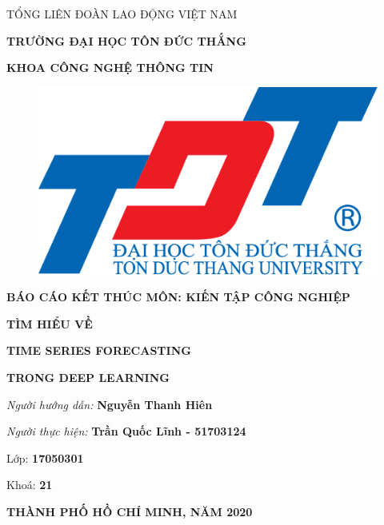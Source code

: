 
\changefontsizes[14pt]{12pt}
\centerline{TỔNG LIÊN ĐOÀN LAO ĐỘNG VIỆT NAM}

\changefontsizes[14pt]{11pt}
\centerline{\textbf{TRƯỜNG ĐẠI HỌC TÔN ĐỨC THẮNG}}
\centerline{\textbf{KHOA CÔNG NGHỆ THÔNG TIN}}

\begin{center}
	\begin{figure}[htp]
		\begin{center}
			\includegraphics[scale=.2]{./images/logo.png}
		\end{center}
	\end{figure}
\end{center}

\changefontsizes{16pt}
\centerline{\textbf{BÁO CÁO KẾT THÚC MÔN: KIẾN TẬP CÔNG NGHIỆP}}
\vspace{1.5cm}
\changefontsizes{24pt}
\centerline{\textbf{TÌM HIỂU VỀ}}
\centerline{\textbf{TIME SERIES FORECASTING}}
\centerline{\textbf{TRONG DEEP LEARNING}}
\vspace{4cm}
\begin{flushright}
	\renewcommand{\baselinestretch}{0.05}
	\changefontsizes{14pt}
	\textit{Người hướng dẫn: }\textbf{Nguyễn Thanh Hiên}
	\setlength{\parskip}{0.5em}
	
	\textit{Người thực hiện: }\textbf{Trần Quốc Lĩnh - 51703124}
	\setlength{\parskip}{0.5em}
	
	Lớp: \textbf{17050301}
	\setlength{\parskip}{0.5em}
	
	Khoá: \textbf{21}
	\setlength{\parskip}{0.5em}
	
\end{flushright}

\vspace{1cm}
\changefontsizes{14pt}
\centerline{\textbf{THÀNH PHỐ HỒ CHÍ MINH, NĂM 2020}}